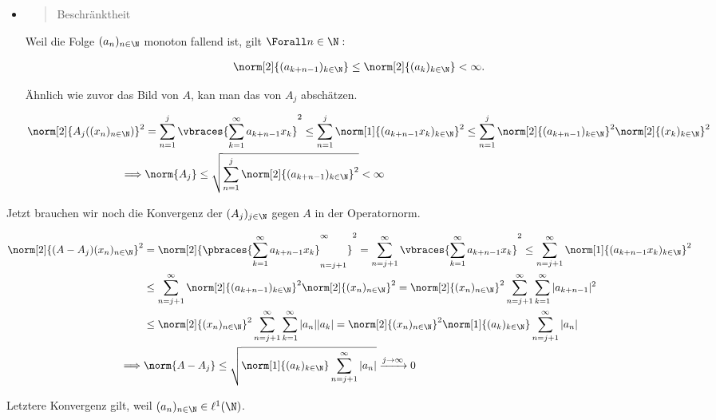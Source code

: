 \begin{solution}
\begin{itemize}
  \item
  \blockquote{Beschränktheit}:

  Weil die Folge $(a_n)_{n \in \N}$ monoton fallend ist, gilt $\Forall n \in \N:$

  \begin{align*}
    \norm[2]{(a_{k+n-1})_{k \in \N}}
    \leq
    \norm[2]{(a_k)_{k \in \N}} < \infty.
  \end{align*}

  Ähnlich wie zuvor das Bild von $A$, kan man das von $A_j$ abschätzen.

  \begin{align*}
    \norm[2]{A_j((x_n)_{n \in \N})}^2
    & =
    \sum_{n=1}^j
    \vbraces
    {
      \sum_{k=1}^\infty
      a_{k+n-1} x_k
    }^2
    \leq
    \sum_{n=1}^j
    \norm[1]{(a_{k+n-1} x_k)_{k \in \N}}^2
    \leq
    \sum_{n=1}^j
    \norm[2]{(a_{k+n-1})_{k \in \N}}^2
    \norm[2]{(x_k)_{k \in \N}}^2 \\
    \implies &
    \norm{A_j}
    \leq
    \sqrt
    {
      \sum_{n=1}^j
      \norm[2]{(a_{k+n-1})_{k \in \N}}^2
    } < \infty
  \end{align*}

\end{itemize}

Jetzt brauchen wir noch die Konvergenz der $(A_j)_{j \in \N}$ gegen $A$ in der Operatornorm.

\begin{align*}
  \norm[2]{(A - A_j)(x_n)_{n \in \N}}^2
  & =
  \norm[2]
  {
    \pbraces
    {
      \sum_{k=1}^\infty
      a_{k+n-1} x_k
    }_{n = j+1}^\infty
  }^2
  =
  \sum_{n = j+1}^\infty
  \vbraces
  {
    \sum_{k=1}^\infty
    a_{k+n-1} x_k
  }^2
  \leq
  \sum_{n = j+1}^\infty
  \norm[1]{(a_{k+n-1} x_k)_{k \in \N}}^2 \\
  & \leq
  \sum_{n = j+1}^\infty
  \norm[2]{(a_{k+n-1})_{k \in \N}}^2
  \norm[2]{(x_n)_{n \in \N}}^2
  =
  \norm[2]{(x_n)_{n \in \N}}^2
  \sum_{n = j+1}^\infty
  \sum_{k=1}^\infty
  |a_{k+n-1}|^2 \\
  & \leq
  \norm[2]{(x_n)_{n \in \N}}^2
  \sum_{n = j+1}^\infty
  \sum_{k=1}^\infty
  |a_n| |a_k|
  =
  \norm[2]{(x_n)_{n \in \N}}^2
  \norm[1]{(a_k)_{k \in \N}}
  \sum_{n = j+1}^\infty |a_n| \\
  \implies &
  \norm{A - A_j}
  \leq
  \sqrt
  {
    \norm[1]{(a_k)_{k \in \N}}
    \sum_{n = j+1}^\infty |a_n|
  }
  \xrightarrow{j \to \infty} 0
\end{align*}

Letztere Konvergenz gilt, weil $(a_n)_{n \in \N} \in \ell^1(\N)$. \\


\end{solution}
